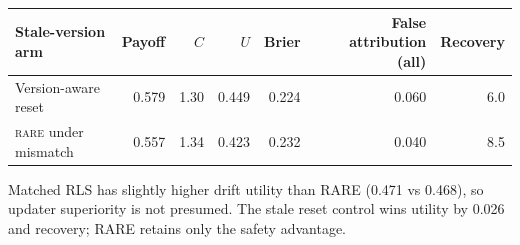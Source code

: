 \documentclass[10pt,a4paper,landscape]{article}
\newcommand{\rare}{\textsc{rare}}\newcommand{\na}{\textsc{n/a}}\newcommand{\nog}{\textsc{no-go}}\newcommand{\ok}{\textsc{pass}}
\begin{document}
\begin{center}\small\begin{tabular}{lrrrrrr}\toprule Stale-version arm & Payoff & $C$ & $U$ & Brier & False attribution (all) & Recovery \\\midrule
Version-aware reset & 0.579 & 1.30 & 0.449 & 0.224 & 0.060 & 6.0 \\

\rare{} under mismatch & 0.557 & 1.34 & 0.423 & 0.232 & 0.040 & 8.5 \\

\bottomrule\end{tabular}\end{center}
Matched RLS has slightly higher drift utility than RARE (0.471 vs 0.468), so updater superiority is not presumed. The stale reset control wins utility by 0.026 and recovery; RARE retains only the safety advantage.
\end{document}
